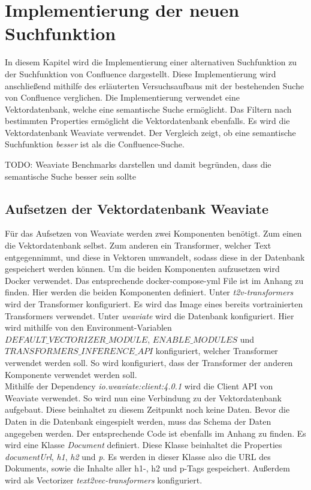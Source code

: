\chapter{Implementierung der neuen Suchfunktion}
In diesem Kapitel wird die Implementierung einer alternativen Suchfunktion zu der Suchfunktion von Confluence dargestellt.
Diese Implementierung wird anschließend mithilfe des erläuterten Versuchsaufbaus mit der bestehenden Suche von Confluence verglichen.
Die Implementierung verwendet eine Vektordatenbank, welche eine semantische Suche ermöglicht.
Das Filtern nach bestimmten Properties ermöglicht die Vektordatenbank ebenfalls.
Es wird die Vektordatenbank Weaviate verwendet.
Der Vergleich zeigt, ob eine semantische Suchfunktion \textit{besser} ist als die Confluence-Suche.

TODO: Weaviate Benchmarks darstellen und damit begründen, dass die semantische Suche besser sein sollte

\section{Aufsetzen der Vektordatenbank Weaviate}
Für das Aufsetzen von Weaviate werden zwei Komponenten benötigt.
Zum einen die Vektordatenbank selbst.
Zum anderen ein Transformer, welcher Text entgegennimmt, und diese in Vektoren umwandelt, sodass diese in der Datenbank gespeichert werden können.
Um die beiden Komponenten aufzusetzen wird Docker verwendet.
Das entsprechende docker-compose-yml File ist im Anhang zu finden.
Hier werden die beiden Komponenten definiert.
Unter \textit{t2v-transformers} wird der Transformer konfiguriert.
Es wird das Image eines bereits vortrainierten Transformers verwendet.
Unter \textit{weaviate} wird die Datenbank konfiguriert.
Hier wird mithilfe von den Environment-Variablen \textit{$DEFAULT\_VECTORIZER\_MODULE$}, \textit{$ENABLE\_MODULES$} und \textit{$TRANSFORMERS\_INFERENCE\_API$} konfiguriert, welcher Transformer verwendet werden soll.
So wird konfiguriert, dass der Transformer der anderen Komponente verwendet werden soll.\\

Mithilfe der Dependency \textit{io.weaviate:client:4.0.1} wird die Client API von Weaviate verwendet.
So wird nun eine Verbindung zu der Vektordatenbank aufgebaut.
Diese beinhaltet zu diesem Zeitpunkt noch keine Daten.
Bevor die Daten in die Datenbank eingespielt werden, muss das Schema der Daten angegeben werden.
Der entsprechende Code ist ebenfalls im Anhang zu finden.
Es wird eine Klasse \textit{Document} definiert.
Diese Klasse beinhaltet die Properties \textit{documentUrl}, \textit{h1}, \textit{h2} und \textit{p}.
Es werden in dieser Klasse also die URL des Dokuments, sowie die Inhalte aller h1-, h2 und p-Tags gespeichert.
Außerdem wird als Vectorizer \textit{text2vec-transformers} konfiguriert.\\

